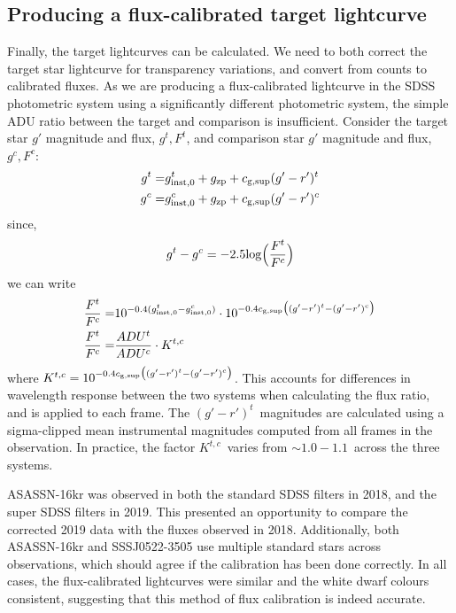 \subsection{Producing a flux-calibrated target lightcurve}
\label{sect:flux calibrating the lightcurve}

Finally, the target lightcurves can be calculated. We need to both correct the target star lightcurve for transparency variations, and convert from counts to calibrated fluxes. As we are producing a flux-calibrated lightcurve in the SDSS photometric system using a significantly different photometric system, the simple ADU ratio between the target and comparison is insufficient. Consider the target star $g'$ magnitude and flux, $g^t, F^t$, and comparison star $g'$ magnitude and flux, $g^c, F^c$:
\begin{align*}
    g^t =& g^t_{\rm inst,0} + g_{\rm zp} + c_{\rm g, sup}(g'-r')^t \\
    g^c =& g^c_{\rm inst,0} + g_{\rm zp} + c_{\rm g, sup}(g'-r')^c \\
\end{align*}
since,
\begin{equation*}
    g^t - g^c = -2.5{\rm log}\Big(\frac{F^t}{F^c}\Big) \\
\end{equation*}
we can write
\begin{align*}
    \frac{F^t}{F^c} =& 10^{-0.4(g^t_{\rm inst,0} - g^c_{\rm inst,0})} \cdot 10^{-0.4c_{\rm g, sup}\big((g'-r')^t - (g'-r')^c\big)} \\
    \frac{F^t}{F^c} =& \frac{ADU^t}{ADU^c}\cdot K^{t,c} \\
\end{align*}
where $K^{t,c} = 10^{-0.4c_{\rm g, sup}\big((g'-r')^t - (g'-r')^c\big)}$.
This accounts for differences in wavelength response between the two systems when calculating the flux ratio, and is applied to each frame. The $(g'-r')^t$\ magnitudes are calculated using a sigma-clipped mean instrumental magnitudes computed from all frames in the observation. In practice, the factor $K^{t,c}$\ varies from $\sim 1.0 - 1.1$\ across the three systems. 

ASASSN-16kr was observed in both the standard SDSS filters in 2018, and the super SDSS filters in 2019. This presented an opportunity to compare the corrected 2019 data with the fluxes observed in 2018. Additionally, both ASASSN-16kr and SSSJ0522-3505 use multiple standard stars across observations, which should agree if the calibration has been done correctly. In all cases, the flux-calibrated lightcurves were similar and the white dwarf colours consistent, suggesting that this method of flux calibration is indeed accurate.


